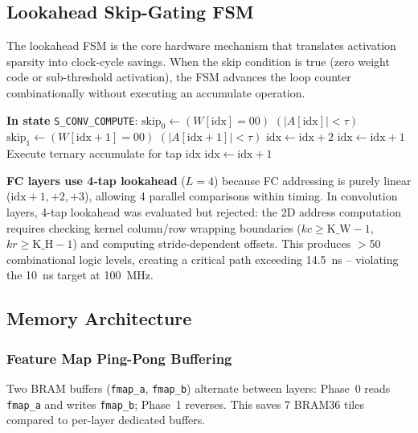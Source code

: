 \documentclass[conference]{IEEEtran}
\begin{document}
\subsection{Lookahead Skip-Gating FSM}
\label{sec:lookahead}

The lookahead FSM is the core hardware mechanism that translates activation sparsity into clock-cycle savings. When the skip condition is true (zero weight code or sub-threshold activation), the FSM advances the loop counter combinationally without executing an accumulate operation.

\begin{algorithm}[H]
\caption{2-Tap Lookahead FSM (Convolution Layers)}
\label{alg:lookahead}
\begin{algorithmic}[1]
\STATE \textbf{In state} \texttt{S\_CONV\_COMPUTE}:
\STATE $\text{skip}_0 \gets (W[\text{idx}] = 00)$ \OR $(|A[\text{idx}]| < \tau)$
\STATE $\text{skip}_1 \gets (W[\text{idx}+1] = 00)$ \OR $(|A[\text{idx}+1]| < \tau)$
    \STATE $\text{idx} \gets \text{idx} + 2$ 
    \STATE $\text{idx} \gets \text{idx} + 1$ 
\ELSE
    \STATE Execute ternary accumulate for tap $\text{idx}$
    \STATE $\text{idx} \gets \text{idx} + 1$
\ENDIF
\end{algorithmic}
\end{algorithm}

\textbf{FC layers use 4-tap lookahead} ($L=4$) because FC addressing is purely linear ($\text{idx}+1, +2, +3$), allowing 4 parallel comparisons within timing. In convolution layers, 4-tap lookahead was evaluated but rejected: the 2D address computation requires checking kernel column/row wrapping boundaries ($kc \geq \text{K\_W}-1$, $kr \geq \text{K\_H}-1$) and computing stride-dependent offsets. This produces $>$50 combinational logic levels, creating a critical path exceeding 14.5~ns -- violating the 10~ns target at 100~MHz.

\subsection{Memory Architecture}

\subsubsection{Feature Map Ping-Pong Buffering}
Two BRAM buffers (\texttt{fmap\_a}, \texttt{fmap\_b}) alternate between layers: Phase~0 reads \texttt{fmap\_a} and writes \texttt{fmap\_b}; Phase~1 reverses. This saves 7 BRAM36 tiles compared to per-layer dedicated buffers.
\end{document}
